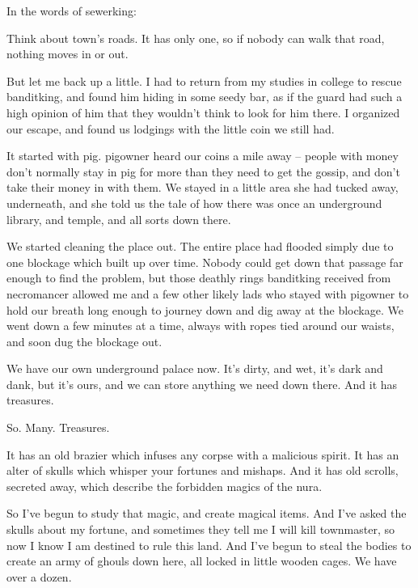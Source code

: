 \begin{multicols}{2}
In the words of \gls{sewerking}:

\begin{exampletext}

  Think about \gls{town}'s roads.
  It has only one, so if nobody can walk that road, nothing moves in or out.

  But let me back up a little.
  I had to return from my studies in \gls{college} to rescue \gls{banditking}, and found him hiding in some seedy bar, as if the \gls{guard} had such a high opinion of him that they wouldn't think to look for him there.
  I organized our escape, and found us lodgings with the little coin we still had.

  It started with \gls{pig}.
  \Gls{pigowner} heard our coins a mile away -- people with money don't normally stay in \gls{pig} for more than they need to get the gossip, and don't take their money in with them.
  We stayed in a little area she had tucked away, underneath, and she told us the tale of how there was once an underground library, and temple, and all sorts down there.

  We started cleaning the place out.
  The entire place had flooded simply due to one blockage which built up over time.
  Nobody could get down that passage far enough to find the problem, but those deathly rings \gls{banditking} received from \gls{necromancer} allowed me and a few other likely lads who stayed with \gls{pigowner} to hold our breath long enough to journey down and dig away at the blockage.
  We went down a few minutes at a time, always with ropes tied around our waists, and soon dug the blockage out.

  We have our own underground palace now.
  It's dirty, and wet, it's dark and dank, but it's ours, and we can store anything we need down there.
  And it has treasures.

  So. Many. Treasures.

  It has an old brazier which infuses any corpse with a malicious spirit.
  It has an alter of skulls which whisper your fortunes and mishaps.
  And it has old scrolls, secreted away, which describe the forbidden magics of the nura.
  
  So I've begun to study that magic, and create magical items.
  And I've asked the skulls about my fortune, and sometimes they tell me I will kill \gls{townmaster}, so now I know I am destined to rule this land.
  And I've begun to steal the bodies to create an army  of ghouls down here, all locked in little wooden cages.
  We have over a dozen.


\end{exampletext}
\end{multicols}
